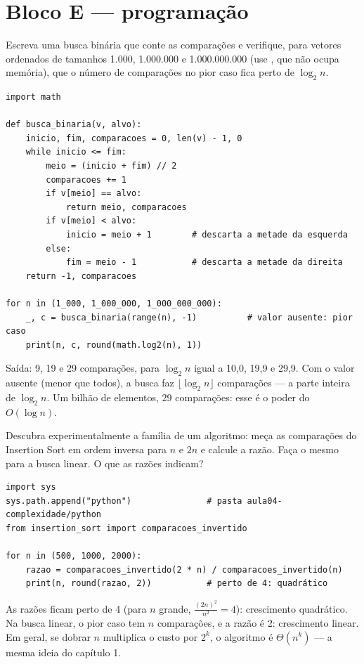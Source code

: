 \section{Bloco E — programação}

Escreva uma busca binária que conte as comparações e verifique, para vetores ordenados de
tamanhos 1.000, 1.000.000 e 1.000.000.000 (use , que não ocupa memória), que o
número de comparações no pior caso fica perto de $\log_2 n$.
\begin{resolucao}
\begin{lstlisting}
import math

def busca_binaria(v, alvo):
    inicio, fim, comparacoes = 0, len(v) - 1, 0
    while inicio <= fim:
        meio = (inicio + fim) // 2
        comparacoes += 1
        if v[meio] == alvo:
            return meio, comparacoes
        if v[meio] < alvo:
            inicio = meio + 1        # descarta a metade da esquerda
        else:
            fim = meio - 1           # descarta a metade da direita
    return -1, comparacoes

for n in (1_000, 1_000_000, 1_000_000_000):
    _, c = busca_binaria(range(n), -1)          # valor ausente: pior caso
    print(n, c, round(math.log2(n), 1))
\end{lstlisting}
Saída: 9, 19 e 29 comparações, para $\log_2 n$ igual a 10,0, 19,9 e 29,9. Com o valor
ausente (menor que todos), a busca faz $\lfloor \log_2 n \rfloor$ comparações — a parte inteira de
$\log_2 n$. Um bilhão de elementos, 29 comparações: esse é o poder do $O(\log n)$.
\end{resolucao}

Descubra experimentalmente a família de um algoritmo: meça as comparações do Insertion Sort em
ordem inversa para $n$ e $2n$ e calcule a razão. Faça o mesmo para a busca linear. O que as razões
indicam?
\begin{resolucao}
\begin{lstlisting}
import sys
sys.path.append("python")               # pasta aula04-complexidade/python
from insertion_sort import comparacoes_invertido

for n in (500, 1000, 2000):
    razao = comparacoes_invertido(2 * n) / comparacoes_invertido(n)
    print(n, round(razao, 2))           # perto de 4: quadrático
\end{lstlisting}
As razões ficam perto de 4 (para $n$ grande, $\frac{(2n)^2}{n^2} = 4$): crescimento quadrático.
Na busca linear, o pior caso tem $n$ comparações, e a razão é 2: crescimento linear. Em geral,
se dobrar $n$ multiplica o custo por $2^k$, o algoritmo é $\Theta(n^k)$ — a mesma ideia do capítulo 1.
\end{resolucao}

